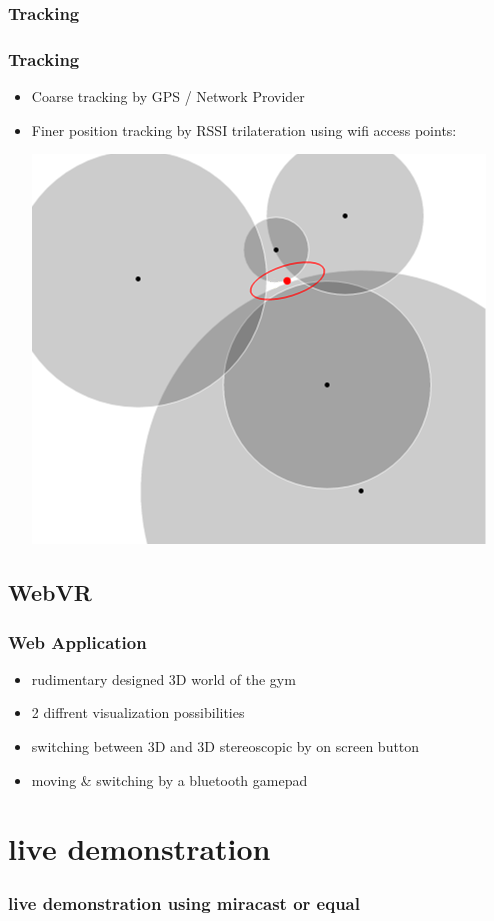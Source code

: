 \documentclass{beamer}
\begin{document}
\subsubsection{Tracking}
\begin{frame}
\frametitle{Tracking}
\begin{itemize}
  	\item	Coarse tracking by GPS / Network Provider
 	\item 	Finer position tracking by RSSI trilateration using wifi access points:\\
			\begin{center}
			\includegraphics[scale=0.5]{trilateration.png}
			\end{center}
	
\end{itemize}
\end{frame}

\subsection{WebVR}
\begin{frame}
\frametitle{Web Application}
\begin{itemize}
  \item rudimentary designed 3D world of the gym
  \item 2 diffrent visualization possibilities
  \item switching between 3D and 3D stereoscopic by on screen button
  \item moving \& switching by a bluetooth gamepad
\end{itemize}
\end{frame}

\section{live demonstration}
\begin{frame}
\frametitle{live demonstration using miracast or equal}

\end{frame}
\end{document}
